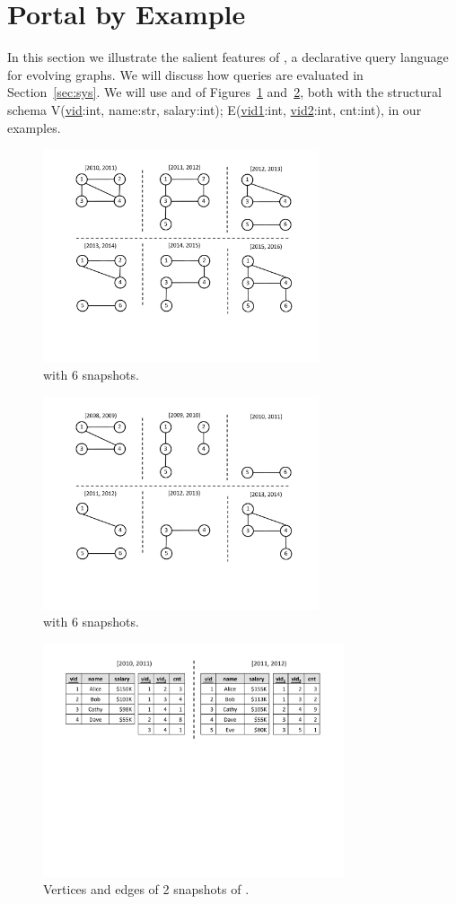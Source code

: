 \section{Portal by Example}
\label{sec:example}

In this section we illustrate the salient features of \ql, a
declarative query language for evolving graphs.  We will discuss how
\ql queries are evaluated in Section~\ref{sec:sys}.  We will use \tgs
{} and  of Figures~\ref{fig:tg} and~\ref{fig:tg_t2},
both with the structural schema V(\underline{vid}:int, name:str,
salary:int); E(\underline{vid1}:int, \underline{vid2}:int, cnt:int),
in our examples.

\begin{figure}[t!]
\includegraphics[width=3.2in]{figs/6snaps.pdf}
\caption{\tg {} with 6 snapshots.} 
\label{fig:tg}
\end{figure}

\begin{figure}[t!]
\includegraphics[width=3.2in]{figs/t2.pdf}
\caption{\tg {} with 6 snapshots.} 
\label{fig:tg_t2}
\end{figure}

\begin{figure}
\includegraphics[width=3.5in]{figs/2VE.pdf}
\caption{Vertices and edges of 2 snapshots of .}
\label{fig:2ve}
\end{figure}

